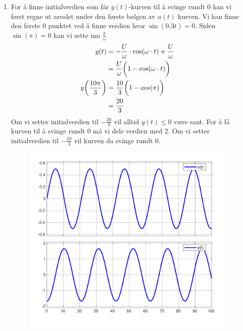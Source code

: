 \documentclass[answers,11pt]{exam}
\begin{document}
\begin{enumerate}[label=\alph*)]
\begin{tcolorbox}
\begin{enumerate}[label=o\arabic*)]
      \item
            For å finne initialverdien som får $y(t)$-kurven til å svinge rundt 0 kan vi først regne
            ut arealet under den første bølgen av $u(t)$ kurven. Vi kan finne den første 0 punktet ved
            å finne verdien hvor $\sin (0.3t) = 0$. Siden $\sin (\pi)= 0$ kan vi sette inn $\frac{\pi}{\omega}$
            \begin{align}
              y(t)                          & = -\frac{U}{\omega} \cdot \cos(\omega \cdot t) + \frac{U}{\omega} \notag \\
                                            & = \frac{U}{\omega}\bigg(1 - \cos(\omega \cdot t)\bigg) \notag            \\
              y\bigg(\frac{10 \pi}{3}\bigg) & = \frac{10}{3}\bigg(1 - cos(\pi)\bigg) \notag                            \\
                                            & = \frac{20}{3}
            \end{align}
            Om vi setter initialverdien til $- \frac{20}{3}$ vil alltid $y(t) \leq 0$ være sant. For
            å få kurven til å svinge rundt 0 må vi dele verdien med 2. Om vi setter initialverdien til
            $- \frac{10}{3}$ vil kurven da svinge rundt 0.
            \parbox{\textwidth}{
              \begin{figure}[H]
                \centering
                \hspace{0mm}\scalebox{0.60}
                {\includegraphics{figurer/sinus_integral_0.pdf}}
                \label{fig:2o2}
              \end{figure}
            }
    \end{enumerate}


\end{tcolorbox}
\end{enumerate}
\end{document}
